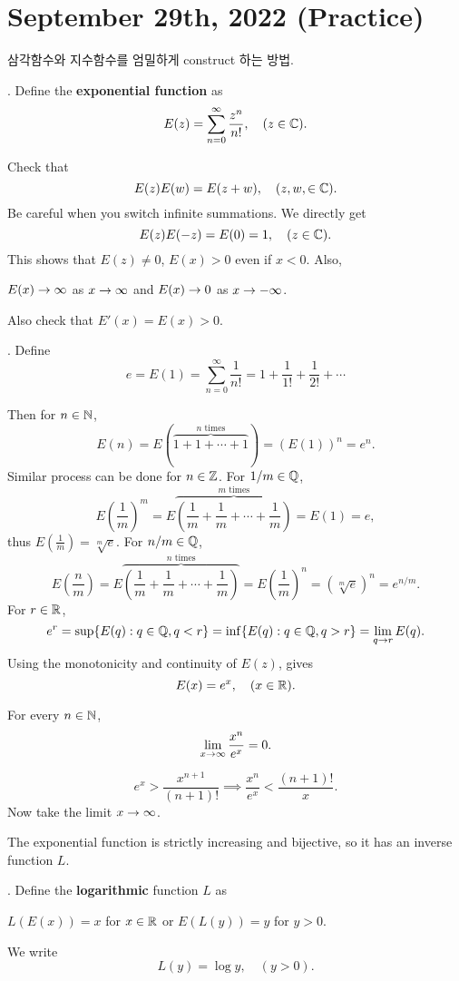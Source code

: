 \section*{September 29th, 2022 (Practice)}

삼각함수와 지수함수를 엄밀하게 construct 하는 방법.

. Define the \textbf{exponential function} as
\[
    E(z) = \sum_{n=0}^\infty \frac{z^n}{n!}, \quad (z \in \mathbb{C}).
\]

Check that
\[
    E(z)E(w) = E(z + w), \quad (z, w, \in \mathbb{C}).
\]
Be careful when you switch infinite summations. We directly get
\[
    E(z)E(-z) = E(0) = 1, \quad (z \in \mathbb{C}).
\]
This shows that \(E(z) \neq 0\), \(E(x) > 0\) even if \(x < 0\). Also,
\begin{center}
    \(E(x) \rightarrow \infty\) as \(x \rightarrow \infty\) \quad and \quad \(E(x) \rightarrow 0\) as \(x \rightarrow -\infty\).
\end{center}
Also check that \(E'(x) = E(x) > 0\).

.  Define
\[
    e = E(1) = \sum_{n=0}^\infty \frac{1}{n!} = 1 + \frac{1}{1!} + \frac{1}{2!} + \cdots
\]

Then for \(n \in \mathbb{N}\),
\[
    E(n) = E(\overbrace{1 + 1 + \cdots + 1}^{n\text{ times}}) = (E(1))^n = e^n.
\]
Similar process can be done for \(n \in \mathbb{Z}\). For \(1/m \in \mathbb{Q}\),
\[
    E\left(\frac{1}{m}\right)^m = E\overbrace{\left(\frac{1}{m} + \frac{1}{m} + \cdots + \frac{1}{m}\right)}^{m\text{ times}} = E(1) = e,
\]
thus \(E\left(\frac{1}{m}\right) = \sqrt[m]{e}\). For \(n/m \in \mathbb{Q}\),
\[
    E\left(\frac{n}{m}\right) = E\overbrace{\left(\frac{1}{m} + \frac{1}{m} + \cdots + \frac{1}{m}\right)}^{n\text{ times}} = E\left(\frac{1}{m}\right)^n = \left(\!\sqrt[m]{e}\right)^n = e^{n/m}.
\]
For \(r \in \mathbb{R}\),
\[
    e^r = \sup\{E(q) : q \in \mathbb{Q}, q < r\} = \inf\{E(q) : q \in \mathbb{Q}, q > r\} = \lim_{q \rightarrow r} E(q).
\]
Using the monotonicity and continuity of \(E(z)\), gives
\[
    E(x) = e^x, \quad (x \in \mathbb{R}).
\]

 For every \(n \in \mathbb{N}\),
\[
    \lim_{x \rightarrow\infty} \frac{x^n}{e^x} = 0.
\]

\pf
\[
    e^x > \frac{x^{n+1}}{(n+1)!} \implies \frac{x^n}{e^x} < \frac{(n+1)!}{x}.
\]
Now take the limit \(x \rightarrow \infty\).

The exponential function is strictly increasing and bijective, so it has an inverse function \hspace*{-1px}\(L\).

. Define the \textbf{logarithmic} function \(L\) as
\begin{center}
    \(L(E(x)) = x\) for \(x \in \mathbb{R}\) \quad or \quad \(E(L(y)) = y\) for \(y > 0\).
\end{center}
We write
\[
    L(y) = \log y, \quad (y > 0).
\]

